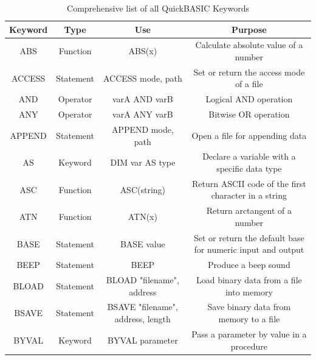\documentclass[10pt, reqno]{exam}
\begin{document}


{
\footnotesize
\begin{longtable}{|c|c|c|c|}
    \caption{Comprehensive list of all QuickBASIC Keywords}
    \label{tbl:keywords} \\
    \hline
    Keyword & Type & Use & Purpose \\
    \hline
    ABS & Function & ABS(x) & Calculate absolute value of a number \\
    ACCESS & Statement & ACCESS mode, path & Set or return the access mode of a file \\
    AND & Operator & varA AND varB & Logical AND operation \\
    ANY & Operator & varA ANY varB & Bitwise OR operation \\
    APPEND & Statement & APPEND mode, path & Open a file for appending data \\
    AS & Keyword & DIM var AS type & Declare a variable with a specific data type \\
    ASC & Function & ASC(string) & Return ASCII code of the first character in a string \\
    ATN & Function & ATN(x) & Return arctangent of a number \\
    BASE & Statement & BASE value & Set or return the default base for numeric input and output \\
    BEEP & Statement & BEEP & Produce a beep sound \\
    BLOAD & Statement & BLOAD "filename", address & Load binary data from a file into memory \\
    BSAVE & Statement & BSAVE "filename", address, length & Save binary data from memory to a file \\
    BYVAL & Keyword & BYVAL parameter & Pass a parameter by value in a procedure \\

\end{longtable}}
\end{document}
